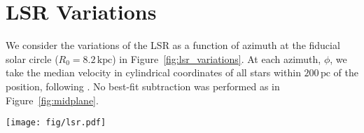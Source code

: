 \documentclass[twocolumn]{aastex62}
\newcommand{\pc}{\text{pc}}
\newcommand{\kpc}{\text{kpc}}
\newcommand{\kms}{\text{km}\,\text{s}^{-1}}
\begin{document}
\section{LSR Variations} \label{app:lsr}
We consider the variations of the LSR as a function of azimuth at the fiducial
solar circle ($R_{0} = 8.2\,\kpc$) in Figure~\ref{fig:lsr_variations}. At each
azimuth, $\phi$, we take the median velocity in cylindrical coordinates of all
stars within $200\,\pc$ of the position, following
\citet{2018arXiv180610564S}. No best-fit subtraction was performed as in
Figure~\ref{fig:midplane}.

\begin{figure*}[htb!]
\begin{center}
\texttt{[image: fig/lsr.pdf]}
\end{center}
\caption{The LSR as a function of azimuth at the fiducial solar circle ($R_0 =
8.2\,\kpc$). No best-fit subtraction is performed here as we did in the case
of the midplane (Section~\ref{ssec:local_midplane}). Variations in $v_z$ are
on the order of $\sim5\textup{--}10\,\kms$.}
\label{fig:lsr_variations}
\end{figure*}


\end{document}
